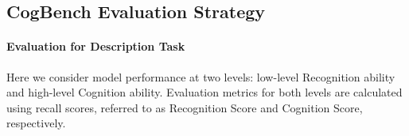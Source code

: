 \subsection{CogBench Evaluation Strategy}

\paragraph{Evaluation for Description Task}

Here we consider model performance at two levels: low-level Recognition ability and high-level Cognition ability. 
Evaluation metrics for both levels are calculated using recall scores, referred to as Recognition Score and Cognition Score, respectively.

